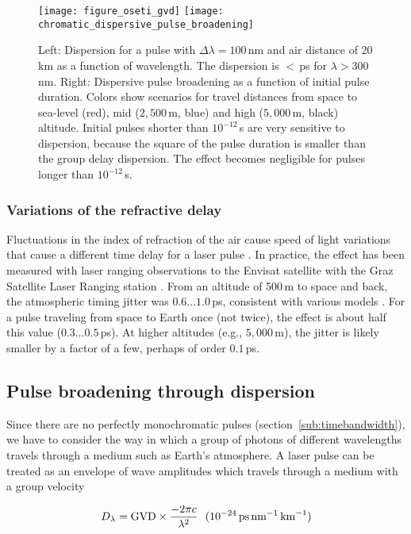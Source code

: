 \documentclass[twocolumn,tighten,longauthor]{myaastex62}
\begin{document}
\begin{figure*}
\texttt{[image: figure\_oseti\_gvd]}
\texttt{[image: chromatic\_dispersive\_pulse\_broadening]}
\caption{\label{fig:chromatic_dispersive_pulse_broadening}Left: Dispersion for a pulse with $\Delta \lambda=100\,$nm and air distance of 20\,km as a function of wavelength. The dispersion is $<\,$ps for $\lambda > 300\,$nm. Right: Dispersive pulse broadening as a function of initial pulse duration. Colors show scenarios for travel distances from space to sea-level (red), mid ($2{,}500$\,m, blue) and high ($5{,}000$\,m, black) altitude. Initial pulses shorter than $10^{-12}\,$s are very sensitive to dispersion, because the square of the pulse duration is smaller than the group delay dispersion. The effect becomes negligible for pulses longer than $10^{-12}\,$s.}
\end{figure*}


\subsubsection{Variations of the refractive delay}
\label{sub:rel_ref_delay}
Fluctuations in the index of refraction of the air cause speed of light variations that cause a different time delay for a laser pulse \citep{Currie2014}. In practice, the effect has been measured with laser ranging observations to the Envisat satellite with the Graz Satellite Laser Ranging station \citep{Prochazka2004,Kral2006}. From an altitude of 500\,m to space and back, the atmospheric timing jitter was $0.6 \dots 1.0\,$ps, consistent with various models \citep{2007JGRB..112.6417H}. For a pulse traveling from space to Earth once (not twice), the effect is about half this value ($0.3 \dots 0.5\,$ps). At higher altitudes (e.g., $5{,}000\,$m), the jitter is likely smaller by a factor of a few, perhaps of order $0.1\,$ps.


\subsection{Pulse broadening through dispersion}
\label{sub:pulse_broad_disp}
Since there are no perfectly monochromatic pulses (section~\ref{sub:timebandwidth}), we have to consider the way in which a group of photons of different wavelengths travels through a medium such as Earth's atmosphere. A laser pulse can be treated as an envelope of wave amplitudes which travels through a medium with a group velocity

\begin{equation}
D_{\lambda} = {\rm GVD} \times \frac{-2 \pi c}{\lambda^2} \,\,\,\,(10^{-24}\,{\rm ps\,nm}^{-1}\,{\rm km}^{-1})
\end{equation}
\end{document}

